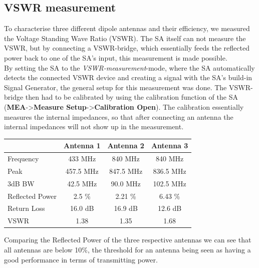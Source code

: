 \subsection{VSWR measurement}
To characterise three different dipole antennas and their efficiency, we measured the Voltage Standing Wave Ratio (VSWR). The SA itself can not measure the VSWR, but by connecting a VSWR-bridge, which essentially feeds the reflected power back to one of the SA's input, this measurement is made possible.\\
By setting the SA to the \textit{VSWR-measurement}-mode, where the SA automatically detects the connected VSWR device and creating a signal with the SA's build-in Signal Generator, the general setup for this measurement was done. The VSWR-bridge then had to be calibrated by using the calibration function of the SA (\textbf{MEA}->\textbf{Measure Setup}->\textbf{Calibration Open}). The calibration essentially measures the internal impedances, so that after connecting an antenna the internal impedances will not show up in the measurement.\\



\begin{center}
\begin{tabular}{l | c | c | c }
	& \textbf{Antenna 1} & \textbf{Antenna 2} & \textbf{Antenna 3}\\
	\hline
	Frequency & 433 MHz & 840 MHz & 840 MHz\\ \hline
	Peak & 457.5 MHz & 847.5 MHz & 836.5 MHz\\ \hline
	3dB BW & 42.5 MHz & 90.0 MHz & 102.5 MHz\\ \hline
	Reflected Power & 2.5 \% & 2.21 \% & 6.43 \% \\ \hline
	Return Loss & 16.0 dB & 16.9 dB & 12.6 dB\\ \hline
	VSWR & 1.38 & 1.35 & 1.68\\ \hline
\end{tabular}
\label{tab:VSWR}
\end{center}

Comparing the Reflected Power of the three respective antennas we can see that all antennas are below 10\%, the threshold for an antenna being seen as having a good performance in terms of transmitting power.


